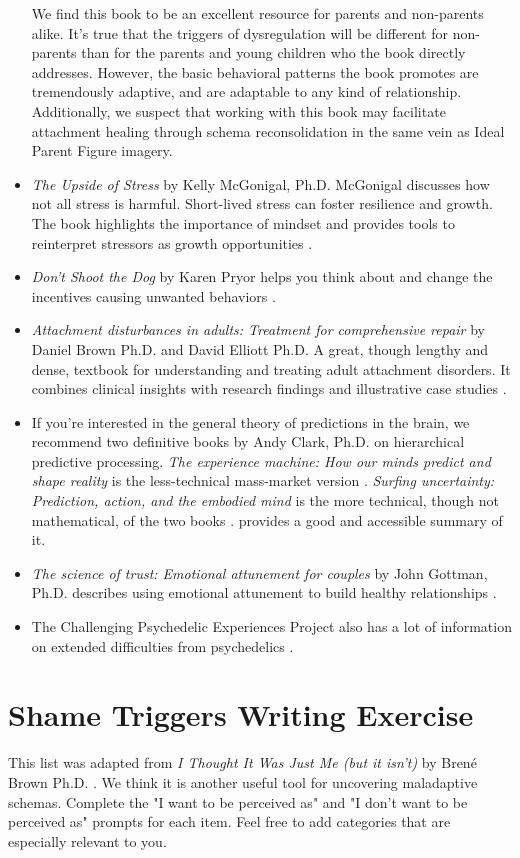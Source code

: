\documentclass[12pt,letterpaper]{book}
\begin{document}
\begin{itemize}
    We find this book to be an excellent resource for parents and non-parents alike. It's true that the triggers of dysregulation will be different for non-parents than for the parents and young children who the book directly addresses. However, the basic behavioral patterns the book promotes are tremendously adaptive, and are adaptable to any kind of relationship. Additionally, we suspect that working with this book may facilitate attachment healing through schema reconsolidation in the same vein as Ideal Parent Figure imagery.
    \item \textit{The Upside of Stress} by Kelly McGonigal, Ph.D. McGonigal discusses how not all stress is harmful. Short-lived stress can foster resilience and growth. The book highlights the importance of mindset and provides tools to reinterpret stressors as growth opportunities \cite{mcgonigalStress}.
    \item \textit{Don't Shoot the Dog} by Karen Pryor helps you think about and change the incentives causing unwanted behaviors \cite{pryorDog}.
    \item \textit{Attachment disturbances in adults: Treatment for comprehensive repair} by Daniel Brown Ph.D. and David Elliott Ph.D. A great, though lengthy and dense, textbook for understanding and treating adult attachment disorders. It combines clinical insights with research findings and illustrative case studies \cite{brownAttachmentDisturbances}.
    \item If you're interested in the general theory of predictions in the brain, we recommend two definitive books by Andy Clark, Ph.D. on hierarchical predictive processing. \textit{The experience machine: How our minds predict and shape reality} is the less-technical mass-market version \cite{clark2024experience}. \textit{Surfing uncertainty: Prediction, action, and the embodied mind} is the more technical, though not mathematical, of the two books \cite{clark2015surfing}. \textcite{alexanderSurfing} provides a good and accessible summary of it.
    \item \textit{The science of trust: Emotional attunement for couples} by John Gottman, Ph.D. describes using emotional attunement to build healthy relationships \cite{gottmanTrust}.
    \item The Challenging Psychedelic Experiences Project also has a lot of information on extended difficulties from psychedelics \cite{peersupportgroup}.
\end{itemize}
\chapter{Shame Triggers Writing Exercise}
\label{sec:shametriggers}
This list was adapted from \textit{I Thought It Was Just Me (but it isn't)} by Brené Brown Ph.D. \cite{brownThought}. We think it is another useful tool for uncovering maladaptive schemas. Complete the "I want to be perceived as" and "I don't want to be perceived as" prompts for each item. Feel free to add categories that are especially relevant to you.
\end{document}
